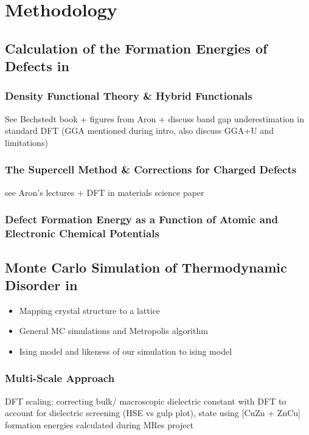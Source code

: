 \chapter{Methodology}

\section{Calculation of the Formation Energies of Defects in \CZTS}
\subsection{Density Functional Theory \& Hybrid Functionals}\label{DFT_section}
See Bechstedt book \cite{Bechstedt} + figures from Aron + discuss band gap underestimation in standard DFT (GGA mentioned during intro, also discuss GGA+U and limitations)


\subsection{The Supercell Method \& Corrections for Charged Defects}\label{supercell_section}
see Aron's lectures + DFT in materials science paper \cite{DFT_in_mat}

\subsection{Defect Formation Energy as a Function of Atomic and Electronic Chemical Potentials}


\section{Monte Carlo Simulation of Thermodynamic Disorder  in \CZTS}
\begin{itemize}
\item Mapping crystal structure to a lattice
\item General MC simulations and Metropolis algorithm
\item Ising model and likeness of our simulation to ising model
\end{itemize}

\subsection{Multi-Scale Approach}
DFT scaling: correcting bulk/ macroscopic dielectric constant with DFT to account for dielectric screening (HSE vs gulp plot), state using [CuZn + ZnCu] formation energies calculated during MRes project

